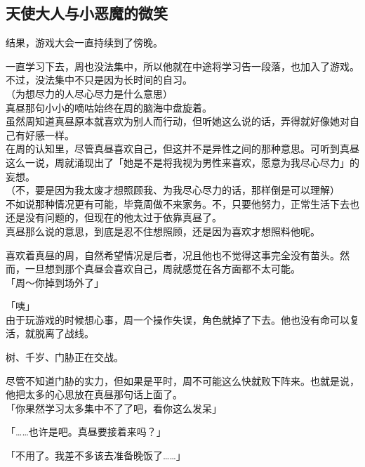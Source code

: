 \subsection{天使大人与小恶魔的微笑}

结果，游戏大会一直持续到了傍晚。

一直学习下去，周也没法集中，所以他就在中途将学习告一段落，也加入了游戏。不过，没法集中不只是因为长时间的自习。\\

（为想尽力的人尽心尽力是什么意思）\\

真昼那句小小的嘀咕始终在周的脑海中盘旋着。\\

虽然周知道真昼原本就喜欢为别人而行动，但听她这么说的话，弄得就好像她对自己有好感一样。\\

在周的认知里，尽管真昼喜欢自己，但这并不是异性之间的那种意思。可听到真昼这么一说，周就涌现出了「她是不是将我视为男性来喜欢，愿意为我尽心尽力」的妄想。\\

（不，要是因为我太废才想照顾我、为我尽心尽力的话，那样倒是可以理解）\\

不如说那种情况更有可能，毕竟周做不来家务。不，只要他努力，正常生活下去也还是没有问题的，但现在的他太过于依靠真昼了。\\

真昼那么说的意思，到底是忍不住想照顾，还是因为喜欢才想照料他呢。

喜欢着真昼的周，自然希望情况是后者，况且他也不觉得这事完全没有苗头。然而，一旦想到那个真昼会喜欢自己，周就感觉在各方面都不太可能。\\

「周～你掉到场外了」

「咦」\\

由于玩游戏的时候想心事，周一个操作失误，角色就掉了下去。他也没有命可以复活，就脱离了战线。

树、千岁、门胁正在交战。

尽管不知道门胁的实力，但如果是平时，周不可能这么快就败下阵来。也就是说，他把太多的心思放在真昼那句话上面了。\\

「你果然学习太多集中不了了吧，看你这么发呆」

「……也许是吧。真昼要接着来吗？」

「不用了。我差不多该去准备晚饭了……」\\

